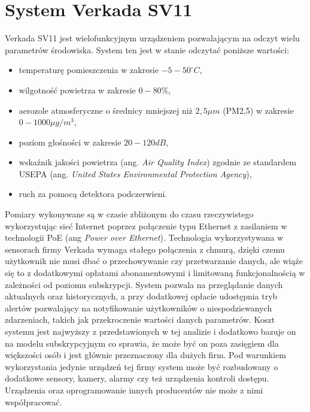 \section{System Verkada SV11}
Verkada SV11\cite{verkadasv11} jest wielofunkcyjnym urządzeniem \cite{verkada:sv11} pozwalającym na odczyt wielu
parametrów środowiska. System ten jest w stanie odczytać poniższe wartości:
\begin{itemize}
  \item temperaturę pomieszczenia w zakresie $-5 - 50 ^\circ C$,
  \item wilgotność powietrza w zakresie $0-80\%$,
  \item aerozole atmosferyczne o średnicy mniejszej niż $2,5\mu m$ (PM2,5) w zakresie $0-1000\mu g/m^3$,
  \item poziom głośności w zakresie $20 - 120dB$,
  \item wskaźnik jakości powietrza (ang. \emph{Air Quality Index}) zgodnie ze standardem USEPA (ang. \emph{United States Environmental Protection Agency}),
  \item ruch za pomocą detektora podczerwieni.
\end{itemize}
Pomiary wykonywane są w czasie zbliżonym do czasu rzeczywistego wykorzystując sieć Internet
poprzez połączenie typu Ethernet z zasilaniem w technologii PoE (ang \emph{Power over Ethernet}). 
Technologia wykorzystywana w sensorach firmy Verkada wymaga stałego połączenia z chmurą, 
dzięki czemu użytkownik nie musi dbać o przechowywanie czy przetwarzanie danych, ale
wiąże się to z dodatkowymi opłatami abonamentowymi i limitowaną funkcjonalnością w zależności
od poziomu subskrypcji. System pozwala na przeglądanie danych aktualnych oraz historycznych, a
przy dodatkowej opłacie udostępnia tryb alertów pozwalający na notyfikowanie użytkowników o
niespodziewanych zdarzeniach, takich jak przekroczenie wartości danych parametrów.
Koszt systemu jest najwyższy z przedstawionych w tej analizie i dodatkowo bazuje on na
modelu subskrypcyjnym co sprawia, że może być on poza zasięgiem dla większości osób i jest
głównie przeznaczony dla dużych firm.
Pod warunkiem wykorzystania jedynie urządzeń tej firmy system może być rozbudowany o 
dodatkowe sensory, kamery, alarmy czy też urządzenia kontroli dostępu. Urządzenia oraz
oprogramowanie innych producentów nie może z nimi współpracować.

